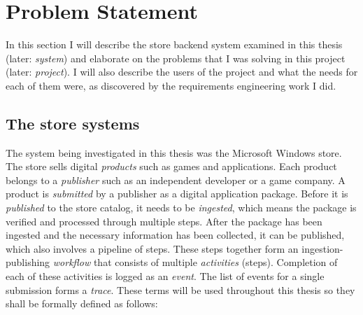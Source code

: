 
\clearpage
\section{Problem Statement}
\label{sec:problem}

In this section I will describe the store backend system examined in this thesis (later: \textit{system}) 
and elaborate on the problems that I was solving in this project (later: \textit{project}). 
I will also describe the users of the project and what the needs for
each of them were, as discovered by the requirements engineering work I did.


\subsection{The store systems}

The system being investigated in this thesis was the Microsoft Windows store.
The store sells digital \emph{products} such as games and applications.
Each product belongs to a \emph{publisher} such as an independent developer or a game company.
A product is \emph{submitted} by a publisher as a digital application package.
Before it is \emph{published} to the store catalog, it needs to be \emph{ingested},
which means the package is verified and processed through multiple steps.
After the package has been ingested and the necessary information has been collected,
it can be published, which also involves a pipeline of steps.
These steps together form an ingestion-publishing \emph{workflow} that consists of multiple \emph{activities} (steps).
Completion of each of these activities is logged as an \emph{event}.
The list of events for a single submission forms a \emph{trace}.
These terms will be used throughout this thesis so they shall be formally defined as follows:


